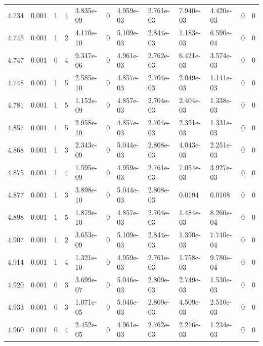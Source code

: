 \documentclass[preview]{standalone}
\begin{document}
{{{{{{\begin{tabular}{L{1.2cm}C{1.2cm} C{0.3cm}C{0.5cm} C{1.4cm}C{1.4cm} C{1.4cm}C{1.4cm} C{1.6cm}C{1.6cm} C{1.6cm}C{1.6cm}}
  4.734  &  0.001  & 1     &  4 &  3.835e-09  & 0  &  4.959e-03&   2.761e-03& 7.940e-03 & 4.420e-03   &  0 & 0  \\ 
  4.745  &  0.001  & 1     &  2 &  4.170e-10  & 0  &  5.109e-03&   2.844e-03& 1.183e-03 & 6.590e-04   &  0 & 0  \\ 
  4.747  &  0.001  & 0     &  4 &  9.347e-06  & 0  &  4.961e-03&   2.762e-03& 6.421e-03 & 3.574e-03   &  0 & 0  \\ 
  4.748  &  0.001  & 1     &  5 &  2.585e-10  & 0  &  4.857e-03&   2.704e-03& 2.049e-03 & 1.141e-03   &  0 & 0  \\ 
  4.781  &  0.001  & 1     &  5 &  1.152e-09  & 0  &  4.857e-03&   2.704e-03& 2.404e-03 & 1.338e-03   &  0 & 0  \\ 
  4.857  &  0.001  & 1     &  5 &  2.958e-10  & 0  &  4.857e-03&   2.704e-03& 2.391e-03 & 1.331e-03   &  0 & 0  \\ 
  4.868  &  0.001  & 1     &  3 &  2.343e-09  & 0  &  5.044e-03&   2.808e-03& 4.043e-03 & 2.251e-03   &  0 & 0  \\ 
  4.875  &  0.001  & 1     &  4 &  1.595e-09  & 0  &  4.959e-03&   2.761e-03& 7.054e-03 & 3.927e-03   &  0 & 0  \\ 
  4.877  &  0.001  & 1     &  3 &  3.898e-10  & 0  &  5.044e-03&   2.808e-03& 0.0194 & 0.0108   &  0 & 0  \\ 
  4.898  &  0.001  & 1     &  5 &  1.879e-10  & 0  &  4.857e-03&   2.704e-03& 1.484e-03 & 8.260e-04   &  0 & 0  \\ 
  4.907  &  0.001  & 1     &  2 &  3.653e-09  & 0  &  5.109e-03&   2.844e-03& 1.390e-03 & 7.740e-04   &  0 & 0  \\ 
  4.914  &  0.001  & 1     &  4 &  1.321e-10  & 0  &  4.959e-03&   2.761e-03& 1.758e-03 & 9.780e-04   &  0 & 0  \\ 
  4.920  &  0.001  & 0     &  3 &  3.699e-07  & 0  &  5.046e-03&   2.809e-03& 2.749e-03 & 1.530e-03   &  0 & 0  \\ 
  4.933  &  0.001  & 0     &  3 &  1.071e-05  & 0  &  5.046e-03&   2.809e-03& 4.509e-03 & 2.510e-03   &  0 & 0  \\ 
  4.960  &  0.001  & 0     &  4 &  2.452e-05  & 0  &  4.961e-03&   2.762e-03& 2.216e-03 & 1.234e-03   &  0 & 0  \\ 
\hline 
\end{tabular} 

}}}}}}
\end{document}
